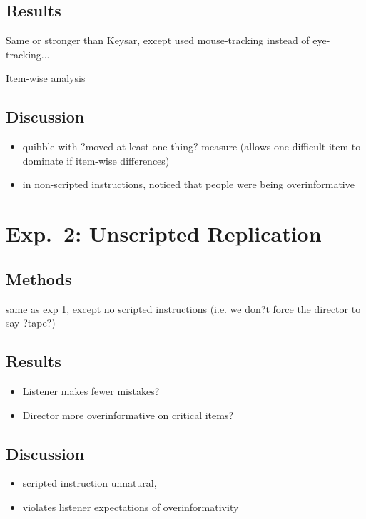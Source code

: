 \documentclass[10pt,letterpaper]{article}
\begin{document}
\subsection{Results}

Same or stronger than Keysar, except used mouse-tracking instead of eye-tracking... 

Item-wise analysis

\subsection{Discussion}

\begin{itemize}
\item quibble with ?moved at least one thing? measure (allows one difficult item to dominate if item-wise differences)
\item in non-scripted instructions, noticed that people were being overinformative
\end{itemize}
        
\section{Exp.~2: Unscripted Replication}
\label{sec:Exp2}

\subsection{Methods}

 same as exp 1, except no scripted instructions (i.e. we don?t force the director to say ?tape?)
 
\subsection{Results}

\begin{itemize}
\item Listener makes fewer mistakes?
\item Director more overinformative on critical items?
\end{itemize}

\subsection{Discussion}

\begin{itemize}
\item scripted instruction unnatural, 
\item violates listener expectations of overinformativity
\end{itemize}
\end{document}
